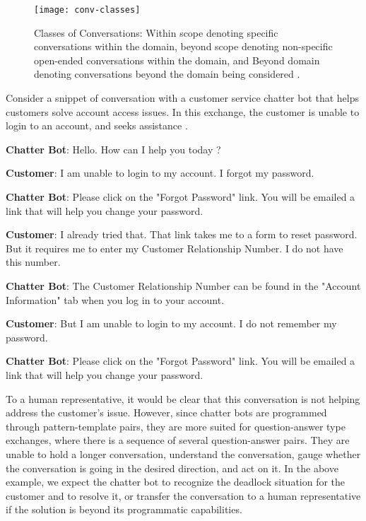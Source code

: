 \begin{figure}[htb]
	\centering
	\texttt{[image: conv-classes]}
	\caption{Classes of Conversations: Within scope denoting specific conversations
within the domain, beyond scope denoting non-specific open-ended conversations
within the domain, and Beyond domain denoting conversations beyond the domain
being considered \cite{chakrabarti2015}.}
	\label{classes-of-conversations}
\end{figure}

Consider a snippet of conversation with a customer service chatter bot that helps customers solve account access issues. In this exchange, the customer is unable to login to an account, and seeks assistance \cite{chakrabarti2015}.
  \bigskip

{ \selectfont

  \color{red}
  \textbf{Chatter Bot}: Hello. How can I help you today ?
  \bigskip
  
  \color{blue}
  \textbf{Customer}: I am unable to login to my account. I forgot my password.
  \bigskip
  
  \color{red}
  \textbf{Chatter Bot}: Please click on the "Forgot Password" link. You will be emailed a link that will help you change your password.
  \bigskip
  
  \color{blue}
  \textbf{Customer}: I already tried that. That link takes me to a form to reset password. But it requires me to enter my Customer Relationship Number. I do not have this number.
  \bigskip
  
  \color{red}
  \textbf{Chatter Bot}: The Customer Relationship Number can be found in the "Account Information" tab when you log in to your account.
  \bigskip
  
  \color{blue}
  \textbf{Customer}: But I am unable to login to my account. I do not remember my password.
  \bigskip
  
  \color{red}
  \textbf{Chatter Bot}: Please click on the "Forgot Password" link. You will be emailed a link that will help you change your password.
  \bigskip
  
  \color{black}
}

To a human representative, it would be clear that this conversation is not helping address the customer’s issue. However, since chatter bots are programmed through pattern-template pairs, they are more suited for question-answer type exchanges, where there is a sequence of several question-answer pairs. They are unable to hold a longer conversation, understand the conversation, gauge whether the conversation is going in the desired direction, and act on it. In the above example, we expect the chatter bot to recognize the deadlock situation for the customer and to resolve it, or transfer the conversation to a human representative if the solution is beyond its programmatic capabilities.

